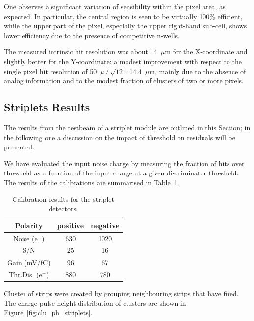 One observes a significant variation of sensibility within the pixel area, as expected. In particular, the central region is seen to be virtually 100\% efficient, while the upper part of the pixel, especially the upper right-hand sub-cell, shows lower efficiency due to the presence of competitive n-wells.

The measured intrinsic hit resolution was about 14~$\mu$m for the X-coordinate and slightly better 
for the Y-coordinate: a modest improvement with respect to the single pixel hit resolution of 
50~$\mu\,/\,\sqrt{12}$=14.4~$\mu$m, mainly due 
to the absence of analog information and to the modest fraction of clusters of two or more pixels.

\subsection{Striplets Results}

The results from the testbeam of a striplet module are outlined in this Section; in the following one
a discussion on the impact of threshold on residuals will be presented.

We have evaluated the input noise charge by measuring the fraction of hits over
 threshold as a
function of the input charge at a given discriminator threshold.
The results of the calibrations are summarised in Table~\ref{tab:FSSR2Calib}.


\begin{table}[hbt]
\begin{center}
\caption{Calibration results for the striplet detectors.
\label{tab:FSSR2Calib}}
\vspace{\baselineskip}
\begin{tabular}{|c|c|c|}
\hline

Polarity & positive  & negative \\

\hline
Noise (e$^-$)& 630       & 1020   \\
S/N      & 25        & 16         \\
Gain (mV/fC)& 96     & 67         \\
Thr.Dis. (e$^-$)& 880       & 780\\ \hline
\end{tabular}
\end{center}
\end{table}

Cluster of strips were created by grouping neighbouring strips that have fired. The charge pulse height 
distribution of clusters are shown in Figure~\ref{fig:clu_ph_striplets}.

